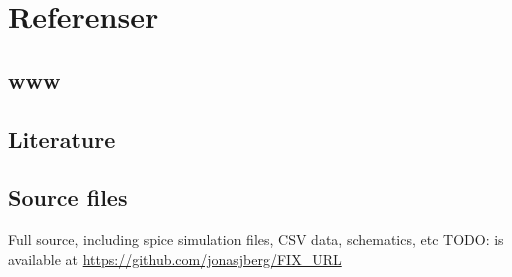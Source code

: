 \section{Referenser}\label{referenser}

\subsection{www}\label{}

\subsection{Literature}\label{}

\subsection{Source files}\label{sources}
Full source, including spice simulation files, CSV data, schematics, etc
TODO: is available at \url{https://github.com/jonasjberg/FIX_URL}

